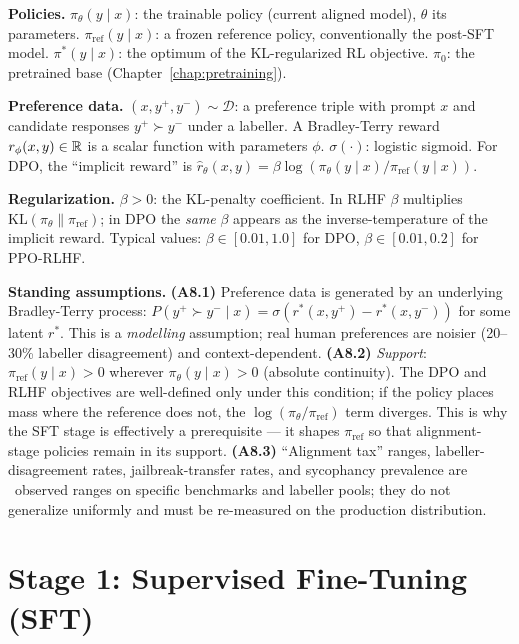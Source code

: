 \begin{notationbox}
\textbf{Policies.}
$\pi_\theta(y \mid x)$: the trainable policy (current aligned model),
$\theta$ its parameters. $\pi_{\mathrm{ref}}(y \mid x)$: a frozen
reference policy, conventionally the post-SFT model. $\pi^*(y \mid x)$:
the optimum of the KL-regularized RL objective.
$\pi_0$: the pretrained base (Chapter~\ref{chap:pretraining}).

\textbf{Preference data.}
$(x, y^+, y^-) \sim \mathcal{D}$: a preference triple with prompt
$x$ and candidate responses $y^+ \succ y^-$ under a labeller. A
Bradley-Terry reward $r_\phi(x,y) \in \mathbb{R}$ is a scalar function with
parameters $\phi$. $\sigma(\cdot)$: logistic sigmoid. For DPO, the
``implicit reward'' is
$\hat r_\theta(x,y) = \beta\log(\pi_\theta(y\mid x)/\pi_{\mathrm{ref}}(y\mid x))$.

\textbf{Regularization.}
$\beta > 0$: the KL-penalty coefficient. In RLHF $\beta$ multiplies
$\mathrm{KL}(\pi_\theta \| \pi_{\mathrm{ref}})$; in DPO the
\emph{same} $\beta$ appears as the inverse-temperature of the
implicit reward. Typical values: $\beta \in [0.01, 1.0]$ for DPO,
$\beta \in [0.01, 0.2]$ for PPO-RLHF.

\textbf{Standing assumptions.}
\textbf{(A8.1)} Preference data is generated by an underlying
Bradley-Terry process: $P(y^+ \succ y^- \mid x) =
\sigma(r^*(x,y^+) - r^*(x,y^-))$ for some latent $r^*$. This is a
\emph{modelling} assumption; real human preferences are noisier
(20--30\% labeller disagreement) and context-dependent.
\textbf{(A8.2)} \emph{Support}: $\pi_{\mathrm{ref}}(y\mid x) > 0$
wherever $\pi_\theta(y\mid x) > 0$ (absolute continuity). The DPO
and RLHF objectives are well-defined only under this condition; if
the policy places mass where the reference does not, the
$\log(\pi_\theta/\pi_{\mathrm{ref}})$ term diverges. This is why
the SFT stage is effectively a prerequisite --- it shapes
$\pi_{\mathrm{ref}}$ so that alignment-stage policies remain in its
support.
\textbf{(A8.3)} ``Alignment tax'' ranges, labeller-disagreement
rates, jailbreak-transfer rates, and sycophancy prevalence are
\Emp\ observed ranges on specific benchmarks and labeller pools;
they do not generalize uniformly and must be re-measured on the
production distribution.
\end{notationbox}

\section{Stage 1: Supervised Fine-Tuning (SFT)}

